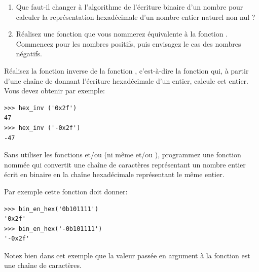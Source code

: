 \documentclass[class=report,crop=false]{standalone}
\begin{document}
\begin{exercicecours}
\sauteligne
\begin{enumerate}
  \item Que faut-il changer à l'algorithme  de l'écriture
  binaire d'un nombre pour calculer la représentation hexadécimale d'un
  nombre entier naturel non nul ?
  \item Réalisez une fonction que vous nommerez  équivalente
  à la fonction . Commencez pour les nombres positifs, puis
  envisagez le cas des nombres négatifs.
\end{enumerate}
\end{exercicecours}


\begin{exercicecours}
Réalisez la fonction  inverse de la fonction
, c'est-à-dire la fonction qui, à partir d'une chaîne de
donnant l'écriture hexadécimale d'un entier, calcule cet entier. Vous
devez obtenir par exemple:
\begin{lstlisting}
>>> hex_inv ('0x2f')
47  
>>> hex_inv ('-0x2f')
-47
\end{lstlisting}
\end{exercicecours}


\begin{exercicecours}
Sans utiliser les fonctions  et/ou  (ni même
 et/ou ), programmez une fonction
nommée  qui convertit une chaîne de caractères
représentant un nombre entier écrit en binaire en la chaîne hexadécimale
représentant le même entier.

Par exemple cette fonction doit donner:
\begin{lstlisting}
>>> bin_en_hex('0b101111')
'0x2f'  
>>> bin_en_hex('-0b101111')
'-0x2f'
\end{lstlisting}
Notez bien dans cet exemple que la valeur passée en argument à la
fonction  est une chaîne de caractères.
\end{exercicecours}




\finchapitre
\end{document}
